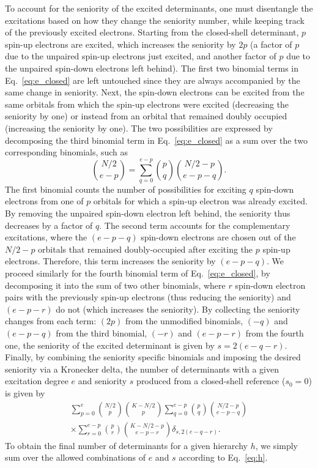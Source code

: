\documentclass[aip,jcp,reprint,noshowkeys,superscriptaddress]{revtex4-1}
\begin{document}
To account for the seniority of the excited determinants, one must disentangle the excitations based on how they change the seniority number,
while keeping track of the previously excited electrons.
Starting from the closed-shell determinant, $p$ spin-up electrons are excited, which increases the seniority by $2p$
(a factor of $p$ due to the unpaired spin-up electrons just excited,
and another factor of $p$ due to the unpaired spin-down electrons left behind).
The first two binomial terms in Eq.~\eqref{eq:e_closed} are left untouched since they are always accompanied by the same change in seniority.
Next, the spin-down electrons can be excited from the same orbitals from which the spin-up electrons were excited (decreasing the seniority by one)
or instead from an orbital that remained doubly occupied (increasing the seniority by one).
The two possibilities are expressed by decomposing the third binomial term in Eq.~\eqref{eq:e_closed} as a sum over the two corresponding binomials, such as
\begin{equation}
	\binom{N/2}{e-p} = \sum_{q=0}^{e-p} \binom{p}{q} \binom{N/2-p}{e-p-q}.
\end{equation}
The first binomial counts the number of possibilities for exciting $q$ spin-down electrons from one of $p$ orbitals for which a spin-up electron was already excited.
By removing the unpaired spin-down electron left behind, the seniority thus decreases by a factor of $q$.
The second term accounts for the complementary excitations, where the $(e-p-q)$ spin-down electrons are chosen out of the $N/2-p$ orbitals that
remained doubly-occupied after exciting the $p$ spin-up electrons.
Therefore, this term increases the seniority by $(e-p-q)$.
We proceed similarly for the fourth binomial term of Eq.~\eqref{eq:e_closed}, by decomposing it into the sum of two other binomials,
where $r$ spin-down electron pairs with the previously spin-up electrons (thus reducing the seniority) and $(e-p-r)$ do not (which increases the seniority).
By collecting the seniority changes from each term: $(2p)$ from the unmodified binomials, $(-q)$ and $(e-p-q)$ from the third binomial, $(-r)$ and $(e-p-r)$ from the fourth one,
the seniority of the excited determinant is given by $s = 2 (e-q-r)$.
Finally, by combining the seniority specific binomials and imposing the desired seniority via a Kronecker delta,
the number of determinants with a given excitation degree $e$ and seniority $s$ produced from a closed-shell reference ($s_0=0$) is given by
\begin{multline}
	\sum_{p=0}^{e} \binom{N/2}{p} \binom{K-N/2}{p}
	\sum_{q=0}^{e-p} \binom{p}{q} \binom{N/2-p}{e-p-q}
	\\ \times
	\sum_{r=0}^{e-p} \binom{p}{r} \binom{K-N/2-p}{e-p-r}
 	\delta_{s,2(e-q-r)}.
\label{eq:det_1}
\end{multline}
To obtain the final number of determinants for a given hierarchy $h$, we simply sum over the allowed combinations of $e$ and $s$ according to Eq.~\eqref{eq:h}.
\end{document}

